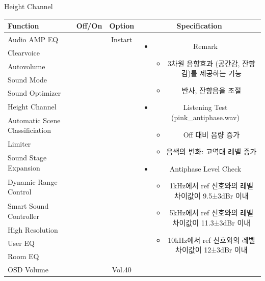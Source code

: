 \documentclass{beamer}
\begin{document}
\begin{frame}[t]{Height Channel}
\begin{tiny}
\begin{tabular}{@{}lccc@{}}
\toprule
Function & Off/On & Option & Specification \\
\midrule
Audio AMP EQ & \color{black}{Off} & Instart &
\multirow{14}{60mm}{
\begin{itemize}
\item Remark
	\begin{itemize}
	\item 3차원 음향효과 (공간감, 잔향감)를 제공하는 기능
	\item 반사, 잔향음을 조절
	\end{itemize}
\item Listening Test (pink\_antiphase.wav)
	\begin{itemize}
	\item Off 대비 음량 증가
	\item 음색의 변화: 고역대 레벨 증가
	\end{itemize}
\item Antiphase Level Check
  \begin{itemize}
  \item 1kHz에서 ref 신호와의 레벨 차이값이 9.5±3dBr 이내
  \item 5kHz에서 ref 신호와의 레벨 차이값이 11.3±3dBr 이내
  \item 10kHz에서 ref 신호와의 레벨 차이값이 12±3dBr 이내
  \end{itemize}
\end{itemize}
} \\
Clearvoice & \color{black}{Off} & & \\
Autovolume & \color{black}{Off} & & \\
Sound Mode & \color{black}{Off} & & \\
Sound Optimizer & \color{black}{Off} & & \\
Height Channel & \color{blue}{On} & & \\
Automatic Scene Classificiation & \color{black}{Off} & & \\
Limiter & \color{black}{Off} & & \\
Sound Stage Expansion & \color{black}{Off} & & \\
Dynamic Range Control & \color{black}{Off} & & \\
Smart Sound Controller & \color{black}{Off} & & \\
High Resolution & \color{black}{Off} & & \\
User EQ & \color{black}{Off} & & \\
Room EQ & \color{black}{Off} & & \\
OSD Volume & \color{blue}{On} & Vol.40 & \\
\midrule
\end{tabular}
\end{tiny}

\end{frame}
\end{document}
